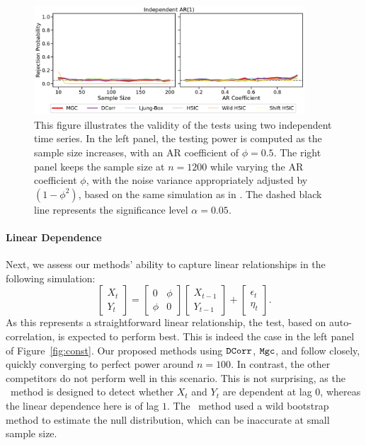 \begin{figure}[ht]
    \centering
    \includegraphics[width=0.9\textwidth]{figures/mgcx/figure1}
    \caption{This figure illustrates the validity of the tests using two independent time series. In the left panel, the testing power is computed as the sample size increases, with an AR coefficient of $\phi=0.5$. The right panel keeps the sample size at $n=1200$ while varying the AR coefficient $\phi$, with the noise variance appropriately adjusted by $(1 - \phi^2)$, based on the same simulation as in \cite{shifthsic}. The dashed black line represents the significance level $\alpha=0.05$. 
    } \label{fig:indep}
\end{figure}

\paragraph{Linear Dependence}
Next, we assess our methods' ability to capture linear relationships in the following simulation:
\begin{equation*}
    \begin{bmatrix}
    X_t\\
    Y_t
    \end{bmatrix}
    =
    \begin{bmatrix}
    0 & \phi\\
    \phi & 0
    \end{bmatrix}
    \begin{bmatrix}
    X_{t-1}\\
    Y_{t-1}
    \end{bmatrix}
    +
    \begin{bmatrix}
    \epsilon_t\\
    \eta_t
    \end{bmatrix}.
\end{equation*}
As this represents a straightforward linear relationship, the \texttt{\LB{}} test, based on auto-correlation, is expected to perform best. This is indeed the case in the left panel of Figure~\ref{fig:const}. Our proposed methods using $\operatorname{\mathtt{DCorr}}${}, $\mathtt{Mgc}${}, and \hsic{} follow closely, quickly converging to perfect power around $n=100$. In contrast, the other competitors do not perform well in this scenario. This is not surprising, as the \shift~method is designed to detect whether $X_t$ and $Y_t$ are dependent at lag $0$, whereas the linear dependence here is of lag $1$. The \wild~method used a wild bootstrap method to estimate the null distribution, which can be inaccurate at small sample size.

